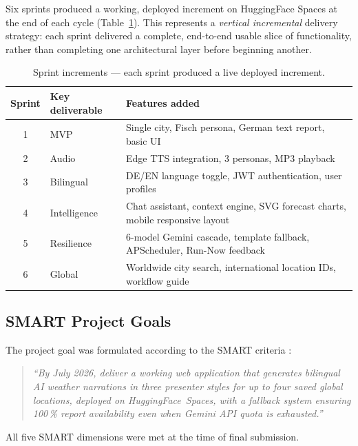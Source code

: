 \documentclass[11pt, a4paper]{article}
\begin{document}
Six sprints produced a working, deployed increment on HuggingFace Spaces at the end of
each cycle (Table~\ref{tab:sprints}). This represents a \textit{vertical incremental}
delivery strategy: each sprint delivered a complete, end-to-end usable slice of
functionality, rather than completing one architectural layer before beginning another.

\begin{table}[H]
  \centering
  \caption{Sprint increments — each sprint produced a live deployed increment.}
  \label{tab:sprints}
  \begin{tabularx}{\linewidth}{@{}clX@{}}
    \toprule
    \textbf{Sprint} & \textbf{Key deliverable} & \textbf{Features added} \\
    \midrule
    1 & MVP          & Single city, Fisch persona, German text report, basic UI \\
    2 & Audio        & Edge TTS integration, 3 personas, MP3 playback \\
    3 & Bilingual    & DE/EN language toggle, JWT authentication, user profiles \\
    4 & Intelligence & Chat assistant, context engine, SVG forecast charts, mobile responsive layout \\
    5 & Resilience   & 6-model Gemini cascade, template fallback, APScheduler, Run-Now feedback \\
    6 & Global       & Worldwide city search, international location IDs, workflow guide \\
    \bottomrule
  \end{tabularx}
\end{table}

\subsection{SMART Project Goals}

The project goal was formulated according to the SMART criteria \citep{doran1981smart}:

\begin{quote}
\textit{``By July 2026, deliver a working web application that generates bilingual AI weather
narrations in three presenter styles for up to four saved global locations, deployed on
HuggingFace~Spaces, with a fallback system ensuring 100\,\% report availability even when
Gemini API quota is exhausted.''}
\end{quote}

All five SMART dimensions were met at the time of final submission.
\end{document}
